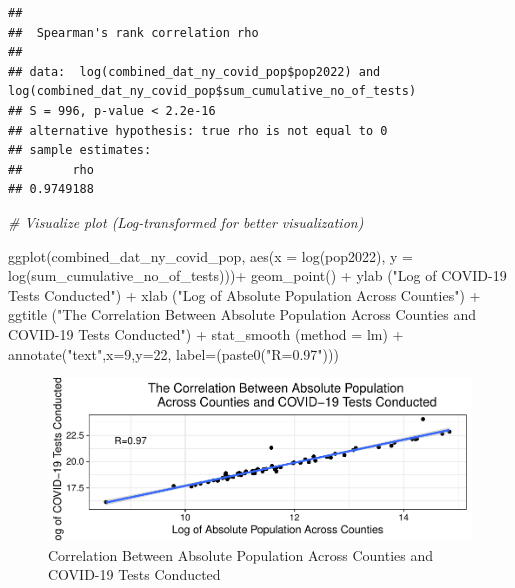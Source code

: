 \documentclass[
  12pt,
]{article}
\newenvironment{Shaded}{\begin{snugshade}}{\end{snugshade}}
\newcommand{\AttributeTok}[1]{\textcolor[rgb]{0.77,0.63,0.00}{#1}}
\newcommand{\CommentTok}[1]{\textcolor[rgb]{0.56,0.35,0.01}{\textit{#1}}}
\newcommand{\DecValTok}[1]{\textcolor[rgb]{0.00,0.00,0.81}{#1}}
\newcommand{\FunctionTok}[1]{\textcolor[rgb]{0.00,0.00,0.00}{#1}}
\newcommand{\NormalTok}[1]{#1}
\newcommand{\SpecialCharTok}[1]{\textcolor[rgb]{0.00,0.00,0.00}{#1}}
\newcommand{\StringTok}[1]{\textcolor[rgb]{0.31,0.60,0.02}{#1}}
\begin{document}
\begin{verbatim}
## 
##  Spearman's rank correlation rho
## 
## data:  log(combined_dat_ny_covid_pop$pop2022) and log(combined_dat_ny_covid_pop$sum_cumulative_no_of_tests)
## S = 996, p-value < 2.2e-16
## alternative hypothesis: true rho is not equal to 0
## sample estimates:
##       rho 
## 0.9749188
\end{verbatim}

\begin{Shaded}
\begin{Highlighting}[]
\CommentTok{\# Visualize plot (Log{-}transformed for better visualization)}

\FunctionTok{ggplot}\NormalTok{(combined\_dat\_ny\_covid\_pop, }\FunctionTok{aes}\NormalTok{(}\AttributeTok{x =} \FunctionTok{log}\NormalTok{(pop2022), }\AttributeTok{y =} \FunctionTok{log}\NormalTok{(sum\_cumulative\_no\_of\_tests)))}\SpecialCharTok{+}
  \FunctionTok{geom\_point}\NormalTok{() }\SpecialCharTok{+}
  \FunctionTok{ylab}\NormalTok{ (}\StringTok{"Log of COVID{-}19 Tests Conducted"}\NormalTok{) }\SpecialCharTok{+}
  \FunctionTok{xlab}\NormalTok{ (}\StringTok{"Log of Absolute Population Across Counties"}\NormalTok{) }\SpecialCharTok{+}
  \FunctionTok{ggtitle}\NormalTok{ (}\StringTok{"The Correlation Between Absolute Population }
\StringTok{           Across Counties and COVID{-}19 Tests Conducted"}\NormalTok{) }\SpecialCharTok{+}
  \FunctionTok{stat\_smooth}\NormalTok{ (}\AttributeTok{method =} \StringTok{\textquotesingle{}lm\textquotesingle{}}\NormalTok{) }\SpecialCharTok{+}
  \FunctionTok{annotate}\NormalTok{(}\StringTok{"text"}\NormalTok{,}\AttributeTok{x=}\DecValTok{9}\NormalTok{,}\AttributeTok{y=}\DecValTok{22}\NormalTok{, }\AttributeTok{label=}\NormalTok{(}\FunctionTok{paste0}\NormalTok{(}\StringTok{"R=0.97"}\NormalTok{)))}
\end{Highlighting}
\end{Shaded}

\begin{figure}

\includegraphics{EDA_Final_Group_Project_files/figure-latex/unnamed-chunk-26-1} \hfill{}

\caption{Correlation Between Absolute Population Across Counties and COVID-19 Tests Conducted}\label{fig:unnamed-chunk-26}
\end{figure}
\end{document}
